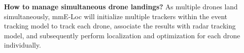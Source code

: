 {\noindent \textbf{How to manage simultaneous drone landings?}
As multiple drones land simultaneously, mmE-Loc will initialize multiple trackers within the event tracking model to track each drone, associate the results with radar tracking model, and subsequently perform localization and optimization for each drone individually.


}

